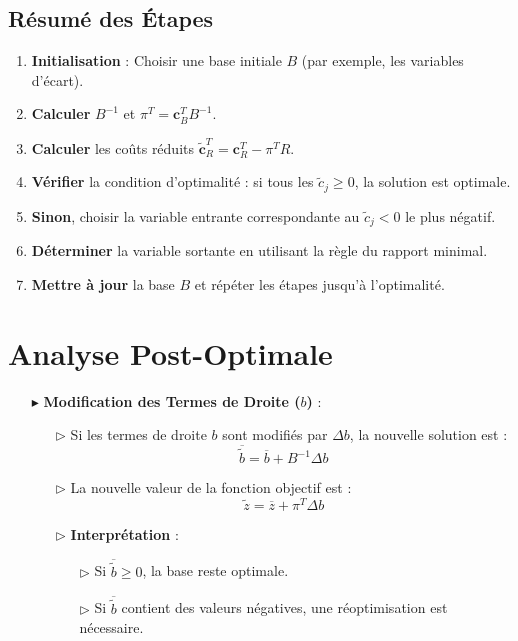 \documentclass{report}
\begin{document}
\begin{multicols*}{2}
\subsection*{Résumé des Étapes}

\begin{enumerate}
    \item \textbf{Initialisation} : Choisir une base initiale \( B \) (par exemple, les variables d'écart).
    \item \textbf{Calculer} \( B^{-1} \) et \( \pi^T = \mathbf{c}_B^T B^{-1} \).
    \item \textbf{Calculer} les coûts réduits \( \tilde{\mathbf{c}}_R^T = \mathbf{c}_R^T - \pi^T R \).
    \item \textbf{Vérifier} la condition d'optimalité : si tous les \( \tilde{c}_j \geq 0 \), la solution est optimale.
    \item \textbf{Sinon}, choisir la variable entrante correspondante au \( \tilde{c}_j < 0 \) le plus négatif.
    \item \textbf{Déterminer} la variable sortante en utilisant la règle du rapport minimal.
    \item \textbf{Mettre à jour} la base \( B \) et répéter les étapes jusqu'à l'optimalité.
\end{enumerate}
\section{Analyse Post-Optimale}

\begin{itemize}
    \item[$\blacktriangleright$] \textbf{Modification des Termes de Droite (\( b \))} :
    \begin{itemize}
        \item[$\rhd$] Si les termes de droite \( b \) sont modifiés par \( \Delta b \), la nouvelle solution est :
        \[
        \boxed{\overline{\tilde{b}} = \overline{b} + B^{-1} \Delta b}
        \]
        \item[$\rhd$] La nouvelle valeur de la fonction objectif est :
        \[
        \boxed{\tilde{z} = \overline{z} + \pi^T \Delta b}
        \]
        \item[$\rhd$] \textbf{Interprétation} :
        \begin{itemize}
            \item[$\rhd$] Si \( \overline{\tilde{b}} \geq 0 \), la base reste optimale.
            \item[$\rhd$] Si \( \overline{\tilde{b}} \) contient des valeurs négatives, une réoptimisation est nécessaire.
        \end{itemize}
    \end{itemize}


\end{itemize}
\end{multicols*}
\end{document}
